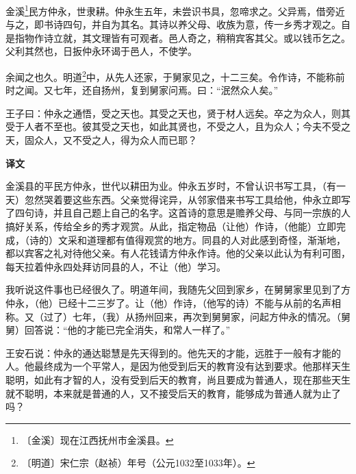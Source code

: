 \documentclass[12pt,UTF-8,openany,a4]{ctexbook}
\begin{document}
\begin{large}
    
    金溪\footnote{〔金溪〕\yiwen 现在江西抚州市金溪县。}民方仲永，世隶耕。仲永生五年，未尝识书具，忽啼求之。父异焉，借旁近与之，即书诗四句，并自为其名。其诗以养父母、收族为意，传一乡秀才观之。自是指物作诗立就，其文理皆有可观者。邑人奇之，稍稍宾客其父。或以钱币乞之。父利其然也，日扳仲永环谒于邑人，不使学。
    
    余闻之也久。明道\footnote{〔明道〕\yiwen 宋仁宗（赵祯）年号（公元1032至1033年）。}中，从先人还家，于舅家见之，十二三矣。令作诗，不能称前时之闻。又七年，还自扬州，复到舅家问焉。曰：“泯然众人矣。”
    
    王子曰：仲永之通悟，受之天也。其受之天也，贤于材人远矣。卒之为众人，则其受于人者不至也。彼其受之天也，如此其贤也，不受之人，且为众人；今夫不受之天，固众人，又不受之人，得为众人而已耶？
\end{large}


\newpage

\begin{Large}
    \noindent\textbf{译文}
\end{Large}


\vspace{1em}

\begin{large}
    \yiwen 
    金溪县的平民方仲永，世代以耕田为业。仲永五岁时，不曾认识书写工具，（有一天）忽然哭着要这些东西。父亲觉得诧异，从邻家借来书写工具给他，仲永立即写了四句诗，并且自己题上自己的名字。这首诗的意思是赡养父母、与同一宗族的人搞好关系，传给全乡的秀才观赏。从此，指定物品（让他）作诗，（他能）立即完成，（诗的）文采和道理都有值得观赏的地方。同县的人对此感到奇怪，渐渐地，都以宾客之礼对待他父亲。有人花钱请方仲永作诗。他的父亲以此认为有利可图，每天拉着仲永四处拜访同县的人，不让（他）学习。
    
    我听说这件事也已经很久了。明道年间，我随先父回到家乡，在舅舅家里见到了方仲永，（他）已经十二三岁了。让（他）作诗，（他写的诗）不能与从前的名声相称。又（过了）七年，（我）从扬州回来，再次到舅舅家，问起方仲永的情况。（舅舅）回答说：“他的才能已完全消失，和常人一样了。”
    
    王安石说：仲永的通达聪慧是先天得到的。他先天的才能，远胜于一般有才能的人。他最终成为一个平常人，是因为他受到后天的教育没有达到要求。他那样天生聪明，如此有才智的人，没有受到后天的教育，尚且要成为普通人，现在那些天生就不聪明，本来就是普通的人，又不接受后天的教育，能够成为普通人就为止了吗？
    
\end{large}
\end{document}
